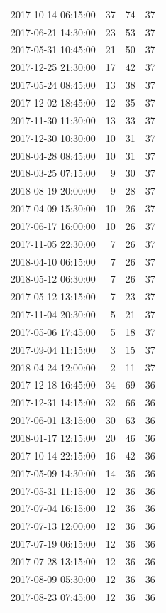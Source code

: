 \begin{tabular}{lrrr}
2017-10-14 06:15:00 & 37 & 74 & 37 \\
2017-06-21 14:30:00 & 23 & 53 & 37 \\
2017-05-31 10:45:00 & 21 & 50 & 37 \\
2017-12-25 21:30:00 & 17 & 42 & 37 \\
2017-05-24 08:45:00 & 13 & 38 & 37 \\
2017-12-02 18:45:00 & 12 & 35 & 37 \\
2017-11-30 11:30:00 & 13 & 33 & 37 \\
2017-12-30 10:30:00 & 10 & 31 & 37 \\
2018-04-28 08:45:00 & 10 & 31 & 37 \\
2018-03-25 07:15:00 & 9 & 30 & 37 \\
2018-08-19 20:00:00 & 9 & 28 & 37 \\
2017-04-09 15:30:00 & 10 & 26 & 37 \\
2017-06-17 16:00:00 & 10 & 26 & 37 \\
2017-11-05 22:30:00 & 7 & 26 & 37 \\
2018-04-10 06:15:00 & 7 & 26 & 37 \\
2018-05-12 06:30:00 & 7 & 26 & 37 \\
2017-05-12 13:15:00 & 7 & 23 & 37 \\
2017-11-04 20:30:00 & 5 & 21 & 37 \\
2017-05-06 17:45:00 & 5 & 18 & 37 \\
2017-09-04 11:15:00 & 3 & 15 & 37 \\
2018-04-24 12:00:00 & 2 & 11 & 37 \\
2017-12-18 16:45:00 & 34 & 69 & 36 \\
2017-12-31 14:15:00 & 32 & 66 & 36 \\
2017-06-01 13:15:00 & 30 & 63 & 36 \\
2018-01-17 12:15:00 & 20 & 46 & 36 \\
2017-10-14 22:15:00 & 16 & 42 & 36 \\
2017-05-09 14:30:00 & 14 & 36 & 36 \\
2017-05-31 11:15:00 & 12 & 36 & 36 \\
2017-07-04 16:15:00 & 12 & 36 & 36 \\
2017-07-13 12:00:00 & 12 & 36 & 36 \\
2017-07-19 06:15:00 & 12 & 36 & 36 \\
2017-07-28 13:15:00 & 12 & 36 & 36 \\
2017-08-09 05:30:00 & 12 & 36 & 36 \\
2017-08-23 07:45:00 & 12 & 36 & 36 \\

\end{tabular}

